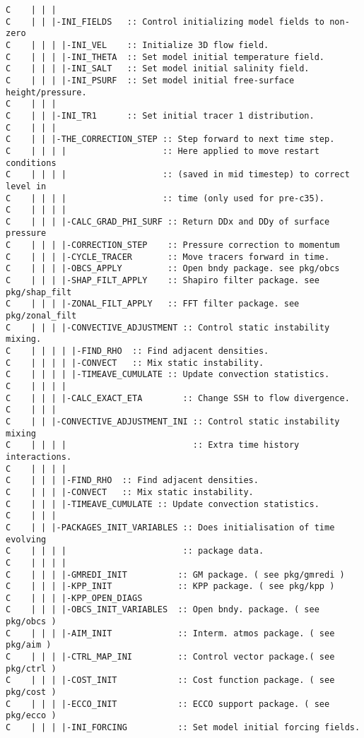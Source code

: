 \begin{verbatim}
C    | | |
C    | | |-INI_FIELDS   :: Control initializing model fields to non-zero
C    | | | |-INI_VEL    :: Initialize 3D flow field.
C    | | | |-INI_THETA  :: Set model initial temperature field.
C    | | | |-INI_SALT   :: Set model initial salinity field.
C    | | | |-INI_PSURF  :: Set model initial free-surface height/pressure.
C    | | |
C    | | |-INI_TR1      :: Set initial tracer 1 distribution.
C    | | |
C    | | |-THE_CORRECTION_STEP :: Step forward to next time step.
C    | | | |                   :: Here applied to move restart conditions
C    | | | |                   :: (saved in mid timestep) to correct level in 
C    | | | |                   :: time (only used for pre-c35).
C    | | | |
C    | | | |-CALC_GRAD_PHI_SURF :: Return DDx and DDy of surface pressure
C    | | | |-CORRECTION_STEP    :: Pressure correction to momentum
C    | | | |-CYCLE_TRACER       :: Move tracers forward in time.
C    | | | |-OBCS_APPLY         :: Open bndy package. see pkg/obcs
C    | | | |-SHAP_FILT_APPLY    :: Shapiro filter package. see pkg/shap_filt
C    | | | |-ZONAL_FILT_APPLY   :: FFT filter package. see pkg/zonal_filt
C    | | | |-CONVECTIVE_ADJUSTMENT :: Control static instability mixing.
C    | | | | |-FIND_RHO  :: Find adjacent densities.
C    | | | | |-CONVECT   :: Mix static instability.
C    | | | | |-TIMEAVE_CUMULATE :: Update convection statistics.
C    | | | | 
C    | | | |-CALC_EXACT_ETA        :: Change SSH to flow divergence.     
C    | | | 
C    | | |-CONVECTIVE_ADJUSTMENT_INI :: Control static instability mixing
C    | | | |                         :: Extra time history interactions.
C    | | | |                       
C    | | | |-FIND_RHO  :: Find adjacent densities.
C    | | | |-CONVECT   :: Mix static instability.
C    | | | |-TIMEAVE_CUMULATE :: Update convection statistics.
C    | | |
C    | | |-PACKAGES_INIT_VARIABLES :: Does initialisation of time evolving 
C    | | | |                       :: package data.
C    | | | |
C    | | | |-GMREDI_INIT          :: GM package. ( see pkg/gmredi )
C    | | | |-KPP_INIT             :: KPP package. ( see pkg/kpp )
C    | | | |-KPP_OPEN_DIAGS    
C    | | | |-OBCS_INIT_VARIABLES  :: Open bndy. package. ( see pkg/obcs )
C    | | | |-AIM_INIT             :: Interm. atmos package. ( see pkg/aim )
C    | | | |-CTRL_MAP_INI         :: Control vector package.( see pkg/ctrl )
C    | | | |-COST_INIT            :: Cost function package. ( see pkg/cost )
C    | | | |-ECCO_INIT            :: ECCO support package. ( see pkg/ecco )
C    | | | |-INI_FORCING          :: Set model initial forcing fields.

\end{verbatim}
